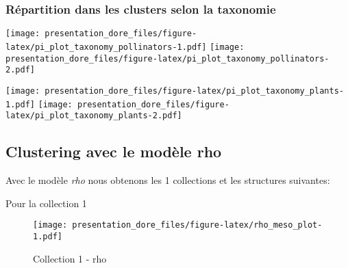 \documentclass[
]{article}
\begin{document}
\hypertarget{ruxe9partition-dans-les-clusters-selon-la-taxonomie-1}{%
\subsubsection{Répartition dans les clusters selon la
taxonomie}\label{ruxe9partition-dans-les-clusters-selon-la-taxonomie-1}}

\texttt{[image: presentation\_dore\_files/figure-latex/pi\_plot\_taxonomy\_pollinators-1.pdf]}
\texttt{[image: presentation\_dore\_files/figure-latex/pi\_plot\_taxonomy\_pollinators-2.pdf]}

\texttt{[image: presentation\_dore\_files/figure-latex/pi\_plot\_taxonomy\_plants-1.pdf]}
\texttt{[image: presentation\_dore\_files/figure-latex/pi\_plot\_taxonomy\_plants-2.pdf]}

\hypertarget{clustering-avec-le-moduxe8le-rho}{%
\subsection{Clustering avec le modèle
rho}\label{clustering-avec-le-moduxe8le-rho}}

Avec le modèle \emph{rho} nous obtenons les 1 collections et les
structures suivantes:

Pour la collection 1

\begin{figure}
\centering
\texttt{[image: presentation\_dore\_files/figure-latex/rho\_meso\_plot-1.pdf]}
\caption{Collection 1 - rho}
\end{figure}
\end{document}
